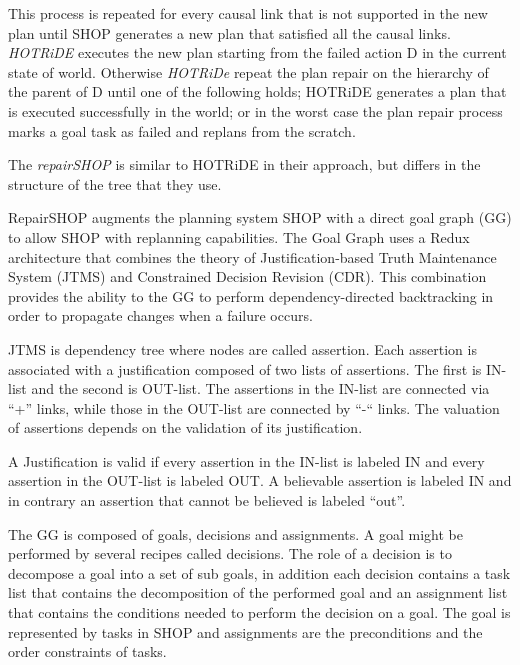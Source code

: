 This process is repeated for every causal link that is not supported in the new plan until SHOP generates a new plan that satisfied all the causal links. \textit{HOTRiDE} executes the new plan starting from the failed action D in the current state of world.  Otherwise \textit{HOTRiDe} repeat the plan repair on the hierarchy of the parent of D until one of the following holds; HOTRiDE generates a plan that is executed successfully in the world; or in the worst case the plan repair process marks a goal task as failed and replans from the scratch. 

The \textit{repairSHOP} \cite{warfield2007adaptation} is similar to HOTRiDE in their approach, but differs in the structure of the tree that they use.

RepairSHOP augments the planning system SHOP with a direct goal graph (GG) to allow SHOP with replanning capabilities.  The Goal Graph uses a Redux architecture that combines the theory of Justification-based Truth Maintenance System (JTMS) and Constrained Decision Revision (CDR). This combination provides the ability to the GG to perform dependency-directed backtracking in order to propagate changes when a failure occurs.  


JTMS is dependency tree where nodes are called assertion. Each assertion is associated with a justification  composed of two lists of assertions. The first is IN-list and the second is OUT-list. The assertions in the IN-list are connected via “+” links, while those in the OUT-list are connected by “-“ links. The valuation of assertions depends on the validation of its justification. 

A Justification is valid if every assertion in the IN-list is labeled IN and every assertion in the OUT-list is labeled OUT. A believable assertion is labeled IN and in contrary an assertion that cannot be believed is labeled “out”. 


The GG is composed of goals, decisions and assignments. A goal might be performed by several recipes called decisions. The role of a decision is to decompose a goal into a set of sub goals, in addition each decision contains a task list that contains the decomposition of the performed goal and an assignment list that contains the conditions needed to perform the decision on a goal. The goal is represented by tasks in SHOP and assignments are the preconditions and the order constraints of tasks.

